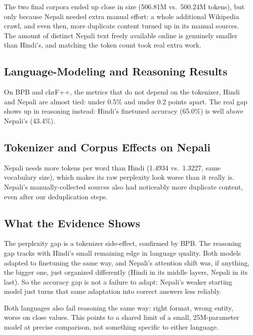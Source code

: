 \documentclass[11pt]{article}
\begin{document}
The two final corpora ended up close in size (506.81M vs.\ 500.24M tokens), but only because Nepali needed extra manual effort: a whole additional Wikipedia crawl, and even then, more duplicate content turned up in its manual sources. The amount of distinct Nepali text freely available online is genuinely smaller than Hindi's, and matching the token count took real extra work.

\subsection{Language-Modeling and Reasoning Results}

On BPB and chrF++, the metrics that do not depend on the tokenizer, Hindi and Nepali are almost tied: under 0.5\% and under 0.2 points apart. The real gap shows up in reasoning instead: Hindi's finetuned accuracy (65.0\%) is well above Nepali's (43.4\%).

\subsection{Tokenizer and Corpus Effects on Nepali}

Nepali needs more tokens per word than Hindi (1.4934 vs.\ 1.3227, same vocabulary size), which makes its raw perplexity look worse than it really is. Nepali's manually-collected sources also had noticeably more duplicate content, even after our deduplication steps.

\subsection{What the Evidence Shows}

The perplexity gap is a tokenizer side-effect, confirmed by BPB. The reasoning gap tracks with Hindi's small remaining edge in language quality. Both models adapted to finetuning the same way, and Nepali's attention shift was, if anything, the bigger one, just organized differently (Hindi in its middle layers, Nepali in its last). So the accuracy gap is not a failure to adapt: Nepali's weaker starting model just turns that same adaptation into correct answers less reliably.

Both languages also fail reasoning the same way: right format, wrong entity, worse on close values. This points to a shared limit of a small, 25M-parameter model at precise comparison, not something specific to either language.

\FloatBarrier
\clearpage
\end{document}

